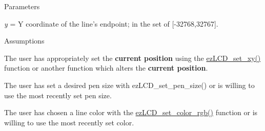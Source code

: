 \begin{DoxyParagraph}{Parameters}

\begin{DoxyItemize}
\item {\itshape y} = Y coordinate of the line's endpoint; in the set of \mbox{[}-\/32768,32767\mbox{]}.
\end{DoxyItemize}
\end{DoxyParagraph}
\begin{DoxyParagraph}{Assumptions}

\begin{DoxyItemize}
\item The user has appropriately set the {\bfseries current position} using the \hyperlink{group__ez_l_c_d__103__coordinates_ga7622b9ff8ad99e99896043bb859812ba}{ez\-L\-C\-D\-\_\-set\-\_\-xy()} function or another function which alters the {\bfseries current position}.
\item The user has set a desired pen size with ez\-L\-C\-D\-\_\-set\-\_\-pen\-\_\-size() or is willing to use the most recently set pen size.
\item The user has chosen a line color with the \hyperlink{group__ez_l_c_d__103__colors_ga6b18ed4d0fb08b58b43a66a507a53dec}{ez\-L\-C\-D\-\_\-set\-\_\-color\-\_\-rgb()} function or is willing to use the most recently set color. 
\end{DoxyItemize}
\end{DoxyParagraph}
